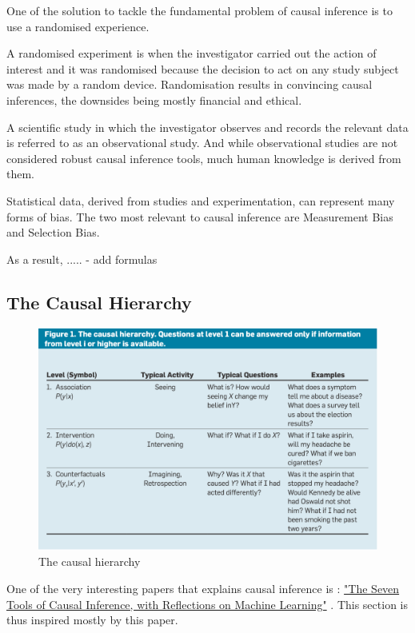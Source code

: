 \documentclass{article}
\begin{document}
One of the solution to tackle the fundamental problem of causal inference is to use a randomised experience. 

A randomised experiment is when the investigator carried out the action of interest and it was randomised because the decision to act on any study subject was made by a random device. Randomisation results in convincing causal inferences, the downsides being mostly financial and ethical. 

A scientific study in which the investigator observes and records the relevant data is referred to as an observational study. And while observational studies are not considered robust causal inference tools, much human knowledge is derived from them.

Statistical data, derived from studies and experimentation, can represent many forms of bias. The two most relevant to causal inference are Measurement Bias and Selection Bias.


As a result, ..... - add formulas


\subsection{The Causal Hierarchy}

\begin{figure}[h]
\centering
\includegraphics[width=0.7 \textwidth]{figures/asso_inter_caus.png}
\caption{The causal hierarchy\cite{pearl2019seven}}
\end{figure}


One of the very interesting papers that explains causal inference is : \href{https://cacm.acm.org/magazines/2019/3/234929-the-seven-tools-of-causal-inference-with-reflections-on-machine-learning/fulltext?mobile=false}{"The Seven Tools of Causal Inference, with Reflections on Machine Learning"} \cite{pearl2019seven}. This section is thus inspired mostly by this paper.
\end{document}
